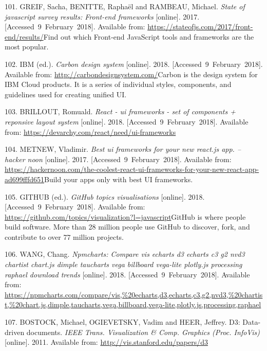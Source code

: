 \documentclass[american,a4paper,oneside,,tablecaptionabove]{scrbook}
\begin{document}
\hypertarget{ref-Greif.2017}{}
101. GREIF, Sacha, BENITTE, Raphaël and RAMBEAU, Michael. \emph{State of
javascript survey results: Front-end frameworks} {[}online{]}. 2017.
{[}Accessed~9~February~2018{]}. Available from:
\url{https://stateofjs.com/2017/front-end/results/}Find out which
Front-end JavaScript tools and frameworks are the most popular.

\hypertarget{ref-IBM.2018}{}
102. IBM (ed.). \emph{Carbon design system} {[}online{]}. 2018.
{[}Accessed~9~February~2018{]}. Available from:
\url{http://carbondesignsystem.com/}Carbon is the design system for IBM
Cloud products. It is a series of individual styles, components, and
guidelines used for creating unified UI.

\hypertarget{ref-Brillout.2018}{}
103. BRILLOUT, Romuald. \emph{React - ui frameworks - set of components
+ reponsive layout system} {[}online{]}. 2018.
{[}Accessed~9~February~2018{]}. Available from:
\url{https://devarchy.com/react/need/ui-frameworks}

\hypertarget{ref-Metnew.2017}{}
104. METNEW, Vladimir. \emph{Best ui frameworks for your new react.js
app. -- hacker noon} {[}online{]}. 2017. {[}Accessed~9~February~2018{]}.
Available from:
\url{https://hackernoon.com/the-coolest-react-ui-frameworks-for-your-new-react-app-ad699fffd651}Build
your apps only with best UI frameworks.

\hypertarget{ref-GitHub.2018}{}
105. GITHUB (ed.). \emph{GitHub topics visualisations} {[}online{]}.
2018. {[}Accessed~9~February~2018{]}. Available from:
\url{https://github.com/topics/visualization?l=javascript}GitHub is
where people build software. More than 28 million people use GitHub to
discover, fork, and contribute to over 77 million projects.

\hypertarget{ref-Wang.2018b}{}
106. WANG, Chang. \emph{Npmcharts: Compare vis echarts d3 echarts c3 g2
nvd3 chartist chart.js dimple taucharts vega billboard vega-lite
plotly.js processing raphael download trends} {[}online{]}. 2018.
{[}Accessed~9~February~2018{]}. Available from:
\url{https://npmcharts.com/compare/vis,\%20echarts,d3,echarts,c3,g2,nvd3,\%20chartist,\%20chart.js,dimple,taucharts,vega,billboard,vega-lite,plotly.js,processing,raphael}

\hypertarget{ref-Bostock.2011}{}
107. BOSTOCK, Michael, OGIEVETSKY, Vadim and HEER, Jeffrey. D3:
Data-driven documents. \emph{IEEE Trans. Visualization \& Comp. Graphics
(Proc. InfoVis)} {[}online{]}. 2011. Available from:
\url{http://vis.stanford.edu/papers/d3}
\end{document}
